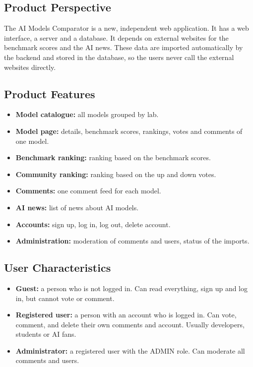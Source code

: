 \documentclass[11pt,a4paper]{article}
\newcommand{\product}{AI Models Comparator}
\begin{document}
\subsection{Product Perspective}

The \product{} is a new, independent web application. It has a web interface, a server and a database. It depends on external websites for the benchmark scores and the AI news. These data are imported automatically by the backend and stored in the database, so the users never call the external websites directly.

\subsection{Product Features}

\begin{itemize}
  \item \textbf{Model catalogue:} all models grouped by lab.
  \item \textbf{Model page:} details, benchmark scores, rankings, votes and comments of one model.
  \item \textbf{Benchmark ranking:} ranking based on the benchmark scores.
  \item \textbf{Community ranking:} ranking based on the up and down votes.
  \item \textbf{Comments:} one comment feed for each model.
  \item \textbf{AI news:} list of news about AI models.
  \item \textbf{Accounts:} sign up, log in, log out, delete account.
  \item \textbf{Administration:} moderation of comments and users, status of the imports.
\end{itemize}

\subsection{User Characteristics}

\begin{itemize}
  \item \textbf{Guest:} a person who is not logged in. Can read everything, sign up and log in, but cannot vote or comment.
  \item \textbf{Registered user:} a person with an account who is logged in. Can vote, comment, and delete their own comments and account. Usually developers, students or AI fans.
  \item \textbf{Administrator:} a registered user with the ADMIN role. Can moderate all comments and users.
\end{itemize}
\end{document}
